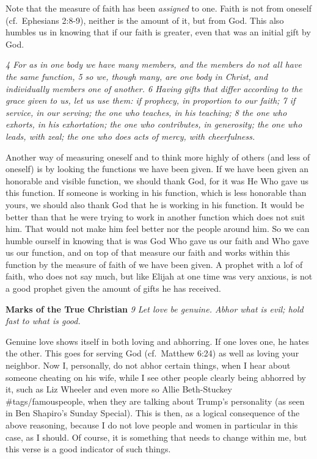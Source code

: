 Note that the measure of faith has been \emph{assigned} to one. Faith is
not from oneself (cf.~Ephesians 2:8-9), neither is the amount of it, but
from God. This also humbles us in knowing that if our faith is greater,
even that was an initial gift by God.

\emph{4 For as in one body we have many members, and the members do not
all have the same function, 5 so we, though many, are one body in
Christ, and individually members one of another. 6 Having gifts that
differ according to the grace given to us, let us use them: if prophecy,
in proportion to our faith; 7 if service, in our serving; the one who
teaches, in his teaching; 8 the one who exhorts, in his exhortation; the
one who contributes, in generosity; the one who leads, with zeal; the
one who does acts of mercy, with cheerfulness.}

Another way of measuring oneself and to think more highly of others (and
less of oneself) is by looking the functions we have been given. If we
have been given an honorable and visible function, we should thank God,
for it was He Who gave us this function. If someone is working in his
function, which is less honorable than yours, we should also thank God
that he is working in his function. It would be better than that he were
trying to work in another function which does not suit him. That would
not make him feel better nor the people around him. So we can humble
ourself in knowing that is was God Who gave us our faith and Who gave us
our function, and on top of that measure our faith and works within this
function by the measure of faith of we have been given. A prophet with a
lof of faith, who does not say much, but like Elijah at one time was
very anxious, is not a good prophet given the amount of gifts he has
received.

\textbf{Marks of the True Christian} \emph{9 Let love be genuine. Abhor
what is evil; hold fast to what is good.}

Genuine love shows itself in both loving and abhorring. If one loves
one, he hates the other. This goes for serving God (cf.~Matthew 6:24) as
well as loving your neighbor. Now I, personally, do not abhor certain
things, when I hear about someone cheating on his wife, while I see
other people clearly being abhorred by it, such as Liz Wheeler and even
more so Allie Beth-Stuckey \#tags/famouspeople, when they are talking
about Trump's personality (as seen in Ben Shapiro's Sunday Special).
This is then, as a logical consequence of the above reasoning, because I
do not love people and women in particular in this case, as I should. Of
course, it is something that needs to change within me, but this verse
is a good indicator of such things.

